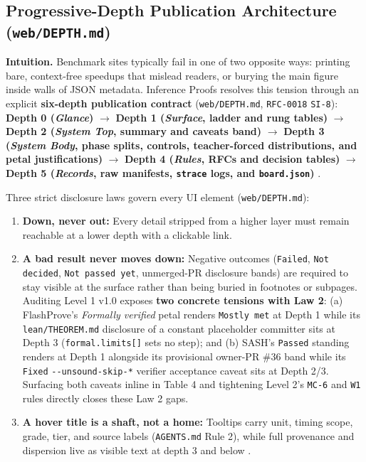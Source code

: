 \documentclass[11pt,letterpaper]{article}
\begin{document}
\subsection{Progressive-Depth Publication Architecture (\texttt{web/\allowbreak{}DEPTH.\allowbreak{}md})}

\textbf{Intuition.} Benchmark sites typically fail in one of two opposite ways: printing bare, context-free speedups that mislead readers, or burying the main figure inside walls of JSON metadata. Inference Proofs resolves this tension through an explicit \textbf{six-depth publication contract} (\texttt{web/\allowbreak{}DEPTH.\allowbreak{}md}, \texttt{RFC-0018} \texttt{SI-8}): \textbf{Depth 0 (\textit{Glance})} $\rightarrow$ \textbf{Depth 1 (\textit{Surface}, ladder and rung tables)} $\rightarrow$ \textbf{Depth 2 (\textit{System Top}, summary and caveats band)} $\rightarrow$ \textbf{Depth 3 (\textit{System Body}, phase splits, controls, teacher-forced distributions, and petal justifications)} $\rightarrow$ \textbf{Depth 4 (\textit{Rules}, RFCs and decision tables)} $\rightarrow$ \textbf{Depth 5 (\textit{Records}, raw manifests, \texttt{strace} logs, and \texttt{board.\allowbreak{}json})} \cite{iproofs2026}.

Three strict disclosure laws govern every UI element (\texttt{web/\allowbreak{}DEPTH.\allowbreak{}md}):

\begin{enumerate}
\item \textbf{Down, never out:} Every detail stripped from a higher layer must remain reachable at a lower depth with a clickable link.
\item \textbf{A bad result never moves down:} Negative outcomes (\texttt{Failed}, \texttt{Not decided}, \texttt{Not passed yet}, unmerged-PR disclosure bands) are required to stay visible at the surface rather than being buried in footnotes or subpages. Auditing Level 1 v1.0 exposes \textbf{two concrete tensions with Law 2}: (a) FlashProve's \textit{Formally verified} petal renders \texttt{Mostly met} at Depth 1 while its \texttt{lean/\allowbreak{}THEOREM.\allowbreak{}md} disclosure of a constant placeholder committer sits at Depth 3 (\texttt{formal.\allowbreak{}limits[]} sets no step); and (b) SASH's \texttt{Passed} standing renders at Depth 1 alongside its provisional owner-PR \#36 band while its \texttt{Fixed} \texttt{-{}-unsound-\allowbreak{}skip-*} verifier acceptance caveat sits at Depth 2/3. Surfacing both caveats inline in Table 4 and tightening Level 2's \texttt{MC-6} and \texttt{W1} rules directly closes these Law 2 gaps.
\item \textbf{A hover title is a shaft, not a home:} Tooltips carry unit, timing scope, grade, tier, and source labels (\texttt{AGENTS.\allowbreak{}md} Rule 2), while full provenance and dispersion live as visible text at depth 3 and below \cite{iproofs2026}.
\end{enumerate}
\end{document}
